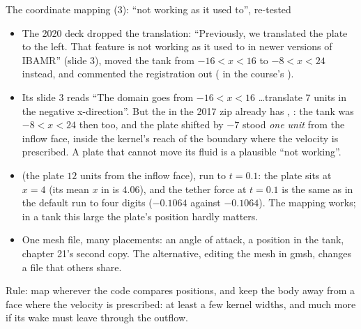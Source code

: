 \documentclass[aspectratio=169,11pt]{beamer}
\begin{document}
\begin{frame}{The coordinate mapping (3): ``not working as it used to'', re-tested}
\label{fr:mapping3}
\scriptsize
\begin{itemize}
  \item The 2020 deck dropped the translation: ``Previously, we translated the plate to the left. That feature is not working as it used to in newer versions of IBAMR'' (slide 3), moved the tank from $-16 < x < 16$ to $-8 < x < 24$ instead, and commented the registration out ( in the course's ).
  \item {} Its slide 3 reads ``The domain goes from $-16 < x < 16$ \ldots translate 7 units in the negative x-direction''. But the  in the 2017 zip already has , : the tank was $-8 < x < 24$ then too, and the plate shifted by $-7$ stood \emph{one unit} from the inflow face, inside the kernel's reach of the boundary where the velocity is prescribed. A plate that cannot move its fluid is a plausible ``not working''.
  \item {}  (the plate $12$ units from the inflow face), run to $t = 0.1$: the plate sits at $x = 4$ (its mean $x$ in  is $4.06$), and the tether force at $t = 0.1$ is the same as in the default run to four digits ($-0.1064$ against $-0.1064$). The mapping works; in a tank this large the plate's position hardly matters.
  \item {} One mesh file, many placements: an angle of attack, a position in the tank, chapter 21's second copy. The alternative, editing the mesh in gmsh, changes a file that others share.
\end{itemize}
\begin{punchbox}
\scriptsize Rule: map  wherever the code compares positions, and keep the body away from a face where the velocity is prescribed: at least a few kernel widths, and much more if its wake must leave through the outflow.
\end{punchbox}
\end{frame}
\end{document}
